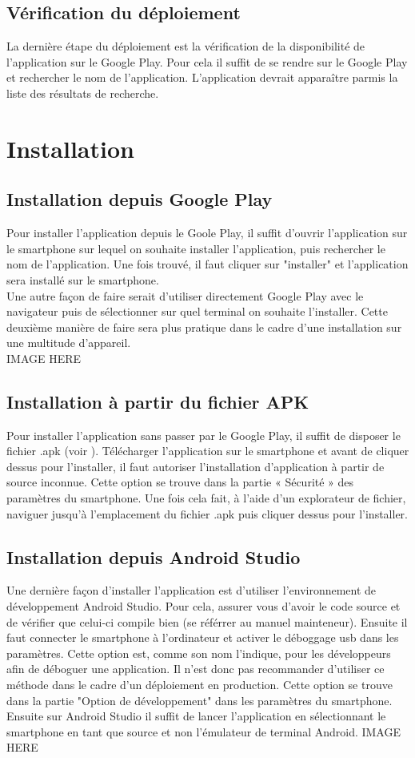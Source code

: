 \documentclass[UTF8]{EPURapport}
\begin{document}
\section{Vérification du déploiement}
La dernière étape du déploiement est la vérification de la disponibilité de l'application sur le Google Play. Pour cela il suffit de se rendre sur le Google Play et rechercher le nom de l'application. L'application devrait apparaître parmis la liste des résultats de recherche.

\chapter{Installation}
\section{Installation depuis Google Play}
Pour installer l'application depuis le Goole Play, il suffit d'ouvrir l'application sur le smartphone sur lequel on souhaite installer l'application, puis rechercher le nom de l'application. 
Une fois trouvé, il faut cliquer sur "installer" et l'application sera installé sur le smartphone. \\
Une autre façon de faire serait d'utiliser directement Google Play avec le navigateur puis de sélectionner sur quel terminal on souhaite l'installer. Cette deuxième manière de faire sera plus pratique 
dans le cadre d'une installation sur une multitude d'appareil. \\
IMAGE HERE
\section{Installation à partir du fichier APK}
Pour installer l'application sans passer par le Google Play, il suffit de disposer le fichier .apk (voir  ). Télécharger l'application sur le smartphone et avant de cliquer dessus pour l'installer, 
il faut autoriser l'installation d'application à partir de source inconnue. Cette option se trouve dans la partie « Sécurité » des paramètres du smartphone. Une fois cela fait, à l'aide d'un explorateur de fichier, naviguer jusqu'à l'emplacement du fichier .apk puis cliquer dessus pour l'installer.

\section{Installation depuis Android Studio}
Une dernière façon d'installer l'application est d'utiliser l'environnement de développement Android Studio. Pour cela, assurer vous d'avoir le code source et de vérifier que celui-ci compile bien (se référrer au manuel mainteneur). Ensuite il faut connecter le smartphone à l'ordinateur et activer le déboggage usb dans les paramètres. Cette option est, comme son nom l’indique, pour les développeurs afin de déboguer une application. Il n'est donc pas recommander d'utiliser ce méthode dans le cadre d'un déploiement en production. Cette option se trouve dans la partie "Option de développement" dans les paramètres du smartphone. Ensuite sur Android Studio il suffit de lancer l'application en sélectionnant le smartphone en tant que source et non l'émulateur de terminal Android.
IMAGE HERE
\end{document}
